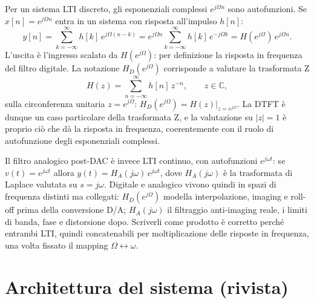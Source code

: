 Per un sistema LTI discreto, gli esponenziali complessi $e^{j\Omega n}$
sono autofunzioni. Se $x[n]=e^{j\Omega n}$ entra in un sistema con
risposta all'impulso $h[n]$:
\begin{equation}
  y[n]=\sum_{k=-\infty}^{\infty}h[k]\,e^{j\Omega(n-k)}
      =e^{j\Omega n}\sum_{k=-\infty}^{\infty}h[k]\,e^{-j\Omega k}
      =H(e^{j\Omega})\,e^{j\Omega n}.
\end{equation}
L'uscita è l'ingresso scalato da $H(e^{j\Omega})$: per definizione la
risposta in frequenza del filtro digitale. La notazione
$H_D(e^{j\Omega})$ corrisponde a valutare la trasformata Z
\begin{equation}
  H(z)=\sum_{n=-\infty}^{\infty}h[n]\,z^{-n},\qquad z\in\mathbb{C},
\end{equation}
sulla circonferenza unitaria $z=e^{j\Omega}$:
$H_D(e^{j\Omega})=H(z)\big|_{z=e^{j\Omega}}$. La DTFT è dunque un caso
particolare della trasformata Z, e la valutazione su $|z|=1$ è proprio ciò
che dà la risposta in frequenza, coerentemente con il ruolo di
autofunzione degli esponenziali complessi.

Il filtro analogico post-DAC è invece LTI continuo, con autofunzioni
$e^{j\omega t}$: se $v(t)=e^{j\omega t}$ allora
$y(t)=H_A(j\omega)\,e^{j\omega t}$, dove $H_A(j\omega)$ è la trasformata di
Laplace valutata su $s=j\omega$. Digitale e analogico vivono quindi in
spazi di frequenza distinti ma collegati: $H_D(e^{j\Omega})$ modella
interpolazione, imaging e roll-off prima della conversione D/A;
$H_A(j\omega)$ il filtraggio anti-imaging reale, i limiti di banda, fase e
distorsione dopo. Scriverli come prodotto è corretto perché entrambi LTI,
quindi concatenabili per moltiplicazione delle risposte in frequenza, una
volta fissato il mapping $\Omega\leftrightarrow\omega$.

\section{Architettura del sistema (rivista)}


